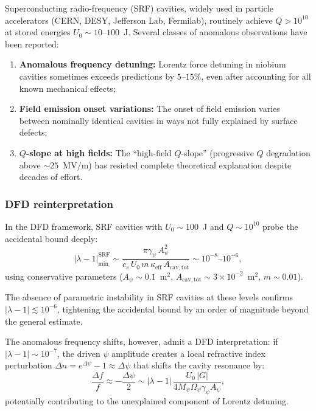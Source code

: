 \documentclass[12pt,aps,prd,twocolumn,superscriptaddress,nofootinbib]{revtex4-2}
\newcommand{\Opsi}{\Omega_\psi}
\newcommand{\gpsi}{\gamma_\psi}
\newcommand{\Mpsi}{M_\psi}
\newcommand{\Apsi}{A_\psi}
\newcommand{\keff}{\kappa_{\mathrm{eff}}}
\newcommand{\Acav}{A_{\mathrm{cav,tot}}}
\newcommand{\lmin}{|\lambda-1|_{\mathrm{min}}}
\begin{document}
Superconducting radio-frequency (SRF) cavities, widely used in particle
accelerators (CERN, DESY, Jefferson Lab, Fermilab), routinely achieve
$Q > 10^{10}$ at stored energies $U_0 \sim 10$--$100$~J.  Several
classes of anomalous observations have been reported:
\begin{enumerate}[noitemsep]
  \item \textbf{Anomalous frequency detuning:}  Lorentz force detuning
    in niobium cavities sometimes exceeds predictions by $5$--$15\%$,
    even after accounting for all known mechanical effects;
  \item \textbf{Field emission onset variations:}  The onset of
    field emission varies between nominally identical cavities in ways
    not fully explained by surface defects;
  \item \textbf{$Q$-slope at high fields:}  The ``high-field $Q$-slope''
    (progressive $Q$ degradation above $\sim 25$~MV/m) has resisted
    complete theoretical explanation despite decades of effort.
\end{enumerate}

\subsubsection{DFD reinterpretation}

In the DFD framework, SRF cavities with $U_0 \sim 100$~J and
$Q \sim 10^{10}$ probe the accidental bound deeply:
\begin{equation}
  \lmin^{\mathrm{SRF}} \sim \frac{\pi\gpsi\,\Apsi^2}
    {c_s\,U_0\,m\,\keff\,\Acav}
  \sim 10^{-8}\text{--}10^{-6},
  \label{eq:SRF_bound}
\end{equation}
using conservative parameters ($\Apsi \sim 0.1$~m$^2$,
$\Acav \sim 3\times 10^{-2}$~m$^2$, $m \sim 0.01$).

The absence of parametric instability in SRF cavities at these levels
confirms $|\lambda - 1| \lesssim 10^{-6}$, tightening the accidental
bound by an order of magnitude beyond the general estimate.

The anomalous frequency shifts, however, admit a DFD interpretation:
if $|\lambda - 1| \sim 10^{-7}$, the driven $\psi$ amplitude creates a
local refractive index perturbation $\Delta n = e^{\Delta\psi} - 1
\approx \Delta\psi$ that shifts the cavity resonance by:
\begin{equation}
  \frac{\Delta f}{f} \approx -\frac{\Delta\psi}{2}
  \sim |\lambda-1|\,\frac{U_0\,|G|}{4\Mpsi\Opsi\gpsi\Apsi},
  \label{eq:freq_shift}
\end{equation}
potentially contributing to the unexplained component of Lorentz
detuning.
\end{document}
